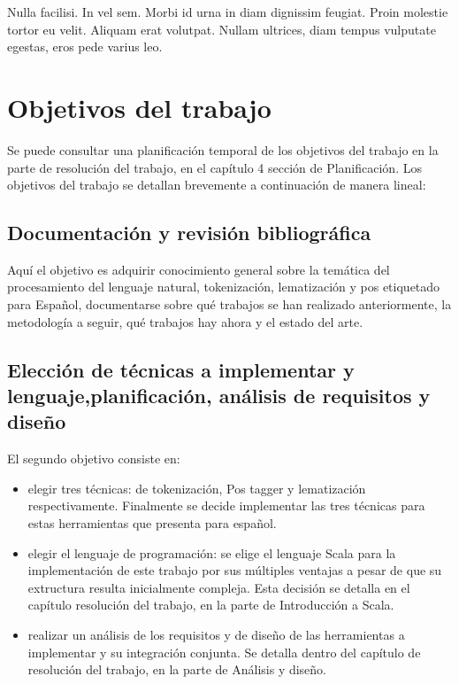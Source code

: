 \begin{savequote}[75mm]
Nulla facilisi. In vel sem. Morbi id urna in diam dignissim feugiat. Proin molestie tortor eu velit. Aliquam erat volutpat. Nullam ultrices, diam tempus vulputate egestas, eros pede varius leo.
\end{savequote}

\chapter{Objetivos del trabajo}
Se puede consultar una planificación temporal de los objetivos del trabajo en la parte de resolución del trabajo, en el capítulo 4 sección de Planificación. Los objetivos del trabajo se detallan brevemente a continuación de manera lineal: 
\section{Documentación y revisión bibliográfica}
Aquí el objetivo es adquirir conocimiento general sobre la temática del procesamiento del lenguaje natural, tokenización, lematización y pos etiquetado para Español, documentarse sobre qué trabajos se han realizado anteriormente, la metodología a seguir, qué trabajos hay ahora y el estado del arte. 
\section{Elección de técnicas a implementar y lenguaje,planificación, análisis de requisitos y diseño}
El segundo objetivo consiste en:
\begin{itemize}
\item elegir tres técnicas: de tokenización, Pos tagger y lematización respectivamente. Finalmente se decide implementar las tres técnicas para estas herramientas que presenta \citet{smedt2012pattern} para español.
\item elegir el lenguaje de programación: se elige el lenguaje Scala para la implementación de este trabajo por sus múltiples ventajas a pesar de que su extructura resulta inicialmente compleja. Esta decisión se detalla en el capítulo resolución del trabajo, en la parte de Introducción a Scala.
\item realizar un análisis de los requisitos y de diseño de las herramientas a implementar y su integración conjunta. Se detalla dentro del capítulo de resolución del trabajo, en la parte de Análisis y diseño.
\end{itemize}

